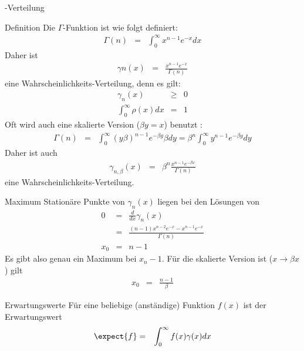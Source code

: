 \begin{chapter}{\titlestr}
\begin{appendix}
\begin{section}{\titlemath{$\Gamma$}-Verteilung}
\label{gamma_distribution}
\begin{subsection}{Definition}
Die $\Gamma$-Funktion ist wie folgt definiert:
\begin{eqnarray*}
\Gamma(n) &=& \int_0^\infty x^{n-1}e^{-x}dx
\end{eqnarray*}
Daher ist
\begin{eqnarray*}
\gamma n(x) &=& \frac{x^{n-1}e^{-x}}{\Gamma(n)}
\end{eqnarray*}
eine Wahrscheinlichkeits-Verteilung, denn es gilt:
\begin{eqnarray*}
\gamma_n(x) &\ge& 0\\
\int_0^\infty \rho(x) dx &=& 1
\end{eqnarray*}
Oft wird auch eine skalierte Version ($\beta y=x$) benutzt :
\begin{eqnarray*}
\Gamma(n) &=& \int_0^\infty \left(y\beta\right)^{n-1}e^{-\beta y}\beta dy
=\beta^n\int_0^\infty y^{n-1}e^{-\beta y}dy
\end{eqnarray*}
Daher ist auch
\begin{eqnarray*}
\gamma_{n,\beta}(x) &=& \beta^n\frac{x^{n-1}e^{-\beta x}}{\Gamma(n)}
\end{eqnarray*}
eine Wahrscheinlichkeits-Verteilung.
\end{subsection}

\begin{subsection}{Maximum}
Stationäre Punkte von $\gamma_n(x)$ liegen bei den Lösungen von
\begin{eqnarray*}
0 &=& \frac{d}{dx}\gamma_n(x)\\
&=& \frac{(n-1)x^{n-2}e^{-x}-x^{n-1}e^{-x}}{\Gamma(n)}\\
x_0 &=& n-1
\end{eqnarray*}
Es gibt also genau ein Maximum bei $x_n-1$.
Für die skalierte Version ist ($x\rightarrow\beta x$) gilt
\begin{eqnarray*}
x_0 &=& \frac{n-1}{\beta}
\end{eqnarray*}
\end{subsection}

\begin{subsection}{Erwartungswerte}
Für eine beliebige (anständige) Funktion $f(x)$ ist der Erwartungswert
\begin{eqnarray*}
\expect{f} &=& \int_0^\infty f(x)\gamma(x) dx
\end{eqnarray*}
\end{subsection}


\end{section}
\end{appendix}
\end{chapter}
